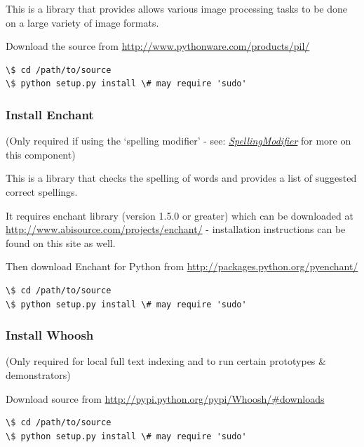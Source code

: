 \documentclass[letterpaper,10pt,english]{sphinxmanual}
\begin{document}
This is a library that provides allows various image processing tasks to be done on a large variety of image formats.

Download the source from \href{http://www.pythonware.com/products/pil/}{http://www.pythonware.com/products/pil/}

\begin{Verbatim}[commandchars=\\\{\}]
\$ cd /path/to/source
\$ python setup.py install \# may require 'sudo'
\end{Verbatim}


\subsubsection{Install Enchant}
\label{installation:install-enchant}
(Only required if using the `spelling modifier' - see: {\hyperref[api2.0:puppy-spelling-mod]{\emph{SpellingModifier}}} for more on this component)

This is a library that checks the spelling of words and provides a list of suggested correct spellings.

It requires enchant library (version 1.5.0 or greater) which can be downloaded at \href{http://www.abisource.com/projects/enchant/}{http://www.abisource.com/projects/enchant/} - installation instructions can be found on this site as well.

Then download Enchant for Python from \href{http://packages.python.org/pyenchant/}{http://packages.python.org/pyenchant/}

\begin{Verbatim}[commandchars=\\\{\}]
\$ cd /path/to/source
\$ python setup.py install \# may require 'sudo'
\end{Verbatim}


\subsubsection{Install Whoosh}
\label{installation:install-whoosh}
(Only required for local full text indexing and to run certain prototypes \& demonstrators)

Download source from \href{http://pypi.python.org/pypi/Whoosh/\#downloads}{http://pypi.python.org/pypi/Whoosh/\#downloads}

\begin{Verbatim}[commandchars=\\\{\}]
\$ cd /path/to/source
\$ python setup.py install \# may require 'sudo'
\end{Verbatim}
\end{document}
